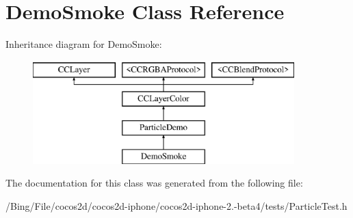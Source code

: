 \hypertarget{interface_demo_smoke}{\section{Demo\-Smoke Class Reference}
\label{interface_demo_smoke}
}
Inheritance diagram for Demo\-Smoke\-:\begin{figure}[H]
\begin{center}
\leavevmode
\includegraphics[height=4.000000cm]{interface_demo_smoke}
\end{center}
\end{figure}


The documentation for this class was generated from the following file\-:\begin{DoxyCompactItemize}
\item 
/\-Bing/\-File/cocos2d/cocos2d-\/iphone/cocos2d-\/iphone-\/2.-\/beta4/tests/Particle\-Test.\-h\end{DoxyCompactItemize}
